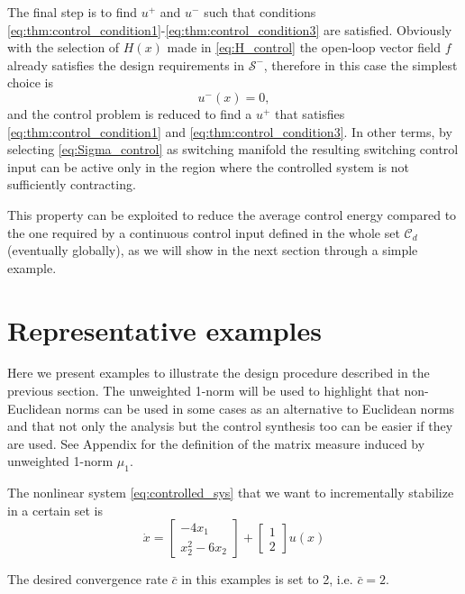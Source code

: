 \documentclass[letterpaper, 10 pt, conference]{ieeeconf}
\begin{document}
The final step is to find $u^+$ and $u^-$ such that conditions \eqref{eq:thm:control_condition1}-\eqref{eq:thm:control_condition3} are satisfied. Obviously with the selection of $H(x)$ made in \eqref{eq:H_control} the open-loop vector field $f$ already satisfies the design requirements in $\mathcal{S}^-$, therefore in this case the simplest choice is 
\begin{equation}
u^-(x)=0,
\end{equation}
and the control problem is reduced to find a $u^+$ that satisfies \eqref{eq:thm:control_condition1} and \eqref{eq:thm:control_condition3}. In other terms, by selecting \eqref{eq:Sigma_control} as switching manifold the resulting switching control input can be active only in the region where the controlled system is not sufficiently contracting. 

This property can be exploited to reduce the average control energy compared to the one required by a continuous control input defined in the whole set $\mathcal{C}_d$ (eventually globally), as we will show in the next section through a simple example.

\section{Representative examples}
\label{sec:examples}

Here we present examples to illustrate the design procedure described in the previous section. The unweighted 1-norm will be used to highlight that non-Euclidean norms can be used in some cases as an alternative to Euclidean norms and that not only the analysis but the control synthesis too can be easier if they are used. See Appendix for the definition of the matrix measure induced by unweighted 1-norm $\mu_1$.

The nonlinear system \eqref{eq:controlled_sys} that we want to incrementally stabilize in a certain set is 
\begin{equation}
\label{eq:example_open_loop}
\dot{x}=
\begin{bmatrix}
-4x_1\\
x_2^2-6x_2
\end{bmatrix}
+
\begin{bmatrix}
1\\
2
\end{bmatrix}
u(x)
\end{equation}

The desired convergence rate $\bar{c}$ in this examples is set to 2, i.e. $\bar{c}=2$.
\end{document}
